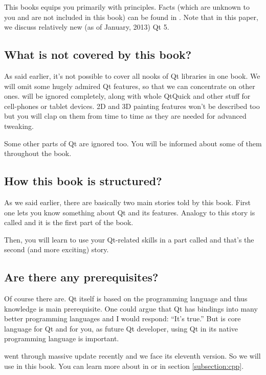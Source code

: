 This books equips you primarily with principles. Facts (which are unknown to you and are not included in this book) can be found in \citep{various:qtdoc}. Note that in this paper, we discuss relatively new (as of January, 2013) Qt 5.


\subsection*{What is not covered by this book?}
As said earlier, it's not possible to cover all nooks of Qt libraries in one book. We will omit some hugely admired Qt features, so that we can concentrate on other ones.  will be ignored completely, along with whole QtQuick and other stuff for cell-phones or tablet devices. 2D and 3D painting features won't be described too but you will clap on them from time to time as they are needed for advanced  tweaking.

Some other parts of Qt are ignored too. You will be informed about some of them throughout the book.

\subsection*{How this book is structured?}
As we said earlier, there are basically two main stories told by this book. First one lets you know something about Qt and its features. Analogy to this story is called  and it is the first part of the book.

Then, you will learn to use your Qt-related skills in a part called  and that's the second (and more exciting) story.

\subsection*{Are there any prerequisites?}
Of course there are. Qt itself is based on the \cpp programming language and thus \cpp knowledge is main prerequisite. One could argue that Qt has bindings into many better programming languages and I would respond: \enquote{It's true.} But \cpp is core language for Qt and for you, as future Qt developer, using Qt in its native programming language is important.

\cpp went through massive update recently and we face its eleventh version. So we will use  in this book. You can learn more about  in \citep{various:cppstandard} or in section \ref{subsection:cpp}.

